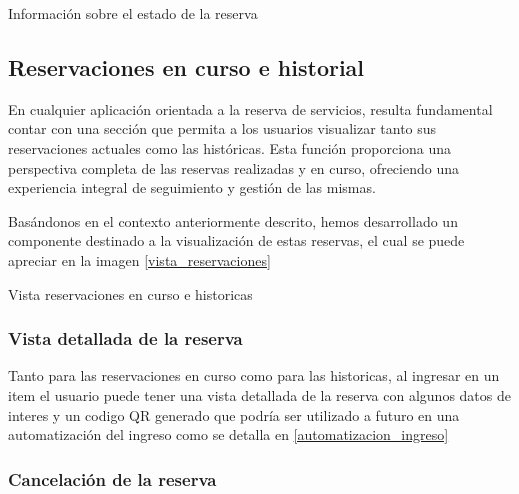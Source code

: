 \begin{images}[\label{reservacion_checkout}]{Información sobre el estado de la reserva}
\end{images}


\subsection{Reservaciones en curso e historial}
En cualquier aplicación orientada a la reserva de servicios, resulta fundamental contar con una sección que permita a los usuarios visualizar tanto sus reservaciones actuales como las históricas. Esta función proporciona una perspectiva completa de las reservas realizadas y en curso, ofreciendo una experiencia integral de seguimiento y gestión de las mismas.

Basándonos en el contexto anteriormente descrito, hemos desarrollado un componente destinado a la visualización de estas reservas, el cual se puede apreciar en la imagen \ref{vista_reservaciones}

\begin{images}[\label{vista_reservaciones}]{Vista reservaciones en curso e historicas}
\end{images}

\subsubsection{Vista detallada de la reserva}
Tanto para las reservaciones en curso como para las historicas, al ingresar en un item el usuario puede tener una vista detallada de la reserva con algunos datos de interes y un codigo QR generado que podría ser utilizado a futuro en una automatización del ingreso como se detalla en \ref{automatizacion_ingreso}


\subsubsection{Cancelación de la reserva}

